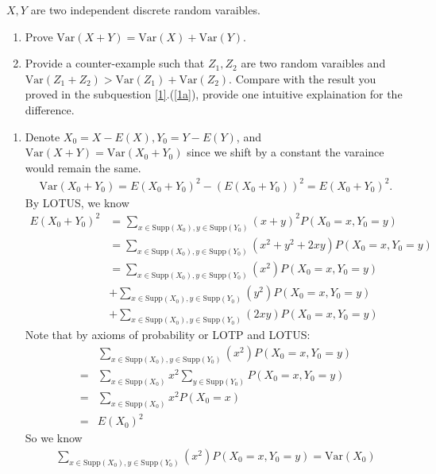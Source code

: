 \begin{exercise}
	\label{1}$X,Y$ are two independent discrete random varaibles.	
	\begin{enumerate}
		\item \label{1a}Prove $\text{Var}(X+Y)=\text{Var}(X)+\text{Var}(Y)$.
		\item Provide a counter-example such that $Z_1,Z_2$ are two random varaibles and  $\text{Var}(Z_1+Z_2)>\text{Var}(Z_1)+\text{Var}(Z_2)$. Compare with the result you proved in the subquestion \ref{1}.(\ref{1a}), provide one intuitive explaination for the difference. 
	\end{enumerate}
\begin{solution}
	\begin{enumerate}
		\item Denote $X_0=X-E(X), Y_0=Y-E(Y)$, and  $\text{Var}(X+Y)=\text{Var}(X_0+Y_0)$ since we shift by a constant the varaince would remain the same. 
		\begin{align*}
			\text{Var}(X_0+Y_0)= E(X_0+Y_0)^2- \left(E(X_0+Y_0)\right)^2 = E(X_0+Y_0)^2.
		\end{align*}
		By LOTUS, we know 
		\begin{align}
			E(X_0+Y_0)^2& =_{} \sum_{x\in \text{Supp}(X_0),y\in \text{Supp}(Y_0)} (x+y)^2 P(X_0=x,Y_0=y)\nonumber\\
			&= \sum_{x\in \text{Supp}(X_0),y\in \text{Supp}(Y_0)} (x^2+y^2+2xy) P(X_0=x,Y_0=y)\nonumber \\
			&= \sum_{x\in \text{Supp}(X_0),y\in \text{Supp}(Y_0)} (x^2 ) P(X_0=x,Y_0=y)\nonumber\\&+\sum_{x\in \text{Supp}(X_0),y\in \text{Supp}(Y_0)} ( y^2 ) P(X_0=x,Y_0=y)\nonumber\\&+\sum_{x\in \text{Supp}(X_0),y\in \text{Supp}(Y_0)} ( 2xy) P(X_0=x,Y_0=y)   \label{11}
		\end{align}
		Note that by axioms of probability or LOTP and LOTUS:
		\begin{align*}
			& \sum_{x\in \text{Supp}(X_0),y\in \text{Supp}(Y_0)} (x^2 ) P(X_0=x,Y_0=y) \\
			=& \sum_{x\in \text{Supp}(X_0) } x^2 \sum_{ y\in \text{Supp}(Y_0)}   P(X_0=x,Y_0=y)\\
			= &  \sum_{x\in \text{Supp}(X_0) } x^2   P(X_0=x)\\
			=& E(X_0)^2
		\end{align*} 
		So we know 
		\begin{align}
			\sum_{x\in \text{Supp}(X_0),y\in \text{Supp}(Y_0)} (x^2 ) P(X_0=x,Y_0=y)=\text{Var}(X_0) \label{12}

\end{align}
\end{enumerate}
\end{solution}
\end{exercise}
